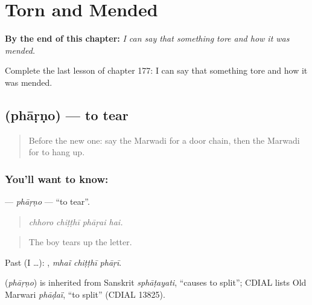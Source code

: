 
\chapter{Torn and Mended}
\label{ch:mw-torn-and-mended}

\begin{chapteropening}
\textbf{By the end of this chapter:} \emph{I can say that something tore and how it was mended.}

Complete the last lesson of chapter 177: I can say that something tore and how it was mended.
\end{chapteropening}

\section[\texorpdfstring{\mw{फाड़णो} (phāṛṇo)}{फाड़णो (phāṛṇo)}]{ (phāṛṇo) — to tear}

\label{lesson:MW-C177-pharno}



\begin{quote}
Before the new one: say the Marwadi for a door chain, then the Marwadi for to hang up.
\end{quote}

\subsection*{You'll want to know: }
\textbf{} — \emph{phāṛṇo} — \textquotedblleft{}to tear\textquotedblright{}.

\begin{quote}
   
\end{quote}

\begin{quote}
\emph{chhoro chiṭṭhī phāṛai hai.}
\end{quote}

\begin{quote}
The boy tears up the letter.
\end{quote}

Past (I …):   , \emph{mhaĩ chiṭṭhī phāṛī}.

\begin{cousinweb}
\textbf{} (\emph{phāṛṇo}) is inherited from Sanskrit \emph{sphāṭayati}, \textquotedblleft{}causes to split\textquotedblright{}; CDIAL lists Old Marwari \emph{phāḍaï}, \textquotedblleft{}to split\textquotedblright{} (CDIAL 13825).
\end{cousinweb}

